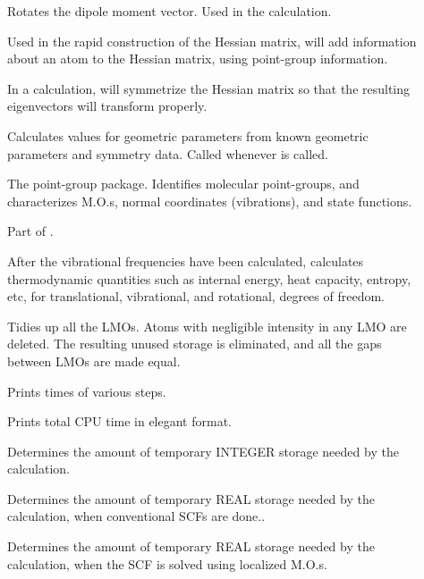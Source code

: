\begin{description}
\item[] Rotates the dipole moment vector. Used in the 
 calculation.

\item[] Used in the rapid construction of the  Hessian
matrix,  will add information about an atom to the Hessian matrix,
using point-group information.

\item[] In a  calculation,  will symmetrize
 the Hessian matrix so that the resulting eigenvectors will transform properly.

\item[] Calculates values for geometric parameters from
known geometric parameters and symmetry data. Called whenever  is
called.

\item[] The point-group package.  Identifies molecular
point-groups, and characterizes M.O.s, normal coordinates (vibrations), and
state functions.

\item[] Part of .

\item[] After the vibrational frequencies have been  calculated,
 calculates thermodynamic quantities such as internal energy, heat
capacity, entropy, etc, for translational, vibrational, and rotational, degrees
of freedom.

\item[]\label{tidy}  Tidies up all the LMOs.   Atoms with
negligible intensity in any LMO are deleted.  The resulting unused storage is
eliminated, and all the gaps between LMOs are made equal.

\item[] Prints times of various steps.

\item[] Prints total CPU time in elegant format.

\item[] Determines the amount of temporary INTEGER storage needed by
the calculation.

\item[] Determines the amount of temporary REAL storage needed by
the calculation, when conventional SCFs are done.. 

\item[] Determines the amount of temporary REAL storage needed by
the calculation, when the SCF is solved using localized M.O.s. 


\end{description}
